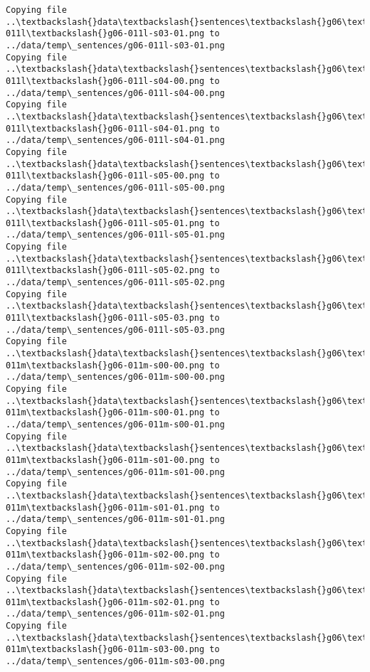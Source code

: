 \documentclass[11pt]{article}
\begin{document}
\begin{Verbatim}[commandchars=\\\{\}]
Copying file ..\textbackslash{}data\textbackslash{}sentences\textbackslash{}g06\textbackslash{}g06-011l\textbackslash{}g06-011l-s03-01.png to
../data/temp\_sentences/g06-011l-s03-01.png
Copying file ..\textbackslash{}data\textbackslash{}sentences\textbackslash{}g06\textbackslash{}g06-011l\textbackslash{}g06-011l-s04-00.png to
../data/temp\_sentences/g06-011l-s04-00.png
Copying file ..\textbackslash{}data\textbackslash{}sentences\textbackslash{}g06\textbackslash{}g06-011l\textbackslash{}g06-011l-s04-01.png to
../data/temp\_sentences/g06-011l-s04-01.png
Copying file ..\textbackslash{}data\textbackslash{}sentences\textbackslash{}g06\textbackslash{}g06-011l\textbackslash{}g06-011l-s05-00.png to
../data/temp\_sentences/g06-011l-s05-00.png
Copying file ..\textbackslash{}data\textbackslash{}sentences\textbackslash{}g06\textbackslash{}g06-011l\textbackslash{}g06-011l-s05-01.png to
../data/temp\_sentences/g06-011l-s05-01.png
Copying file ..\textbackslash{}data\textbackslash{}sentences\textbackslash{}g06\textbackslash{}g06-011l\textbackslash{}g06-011l-s05-02.png to
../data/temp\_sentences/g06-011l-s05-02.png
Copying file ..\textbackslash{}data\textbackslash{}sentences\textbackslash{}g06\textbackslash{}g06-011l\textbackslash{}g06-011l-s05-03.png to
../data/temp\_sentences/g06-011l-s05-03.png
Copying file ..\textbackslash{}data\textbackslash{}sentences\textbackslash{}g06\textbackslash{}g06-011m\textbackslash{}g06-011m-s00-00.png to
../data/temp\_sentences/g06-011m-s00-00.png
Copying file ..\textbackslash{}data\textbackslash{}sentences\textbackslash{}g06\textbackslash{}g06-011m\textbackslash{}g06-011m-s00-01.png to
../data/temp\_sentences/g06-011m-s00-01.png
Copying file ..\textbackslash{}data\textbackslash{}sentences\textbackslash{}g06\textbackslash{}g06-011m\textbackslash{}g06-011m-s01-00.png to
../data/temp\_sentences/g06-011m-s01-00.png
Copying file ..\textbackslash{}data\textbackslash{}sentences\textbackslash{}g06\textbackslash{}g06-011m\textbackslash{}g06-011m-s01-01.png to
../data/temp\_sentences/g06-011m-s01-01.png
Copying file ..\textbackslash{}data\textbackslash{}sentences\textbackslash{}g06\textbackslash{}g06-011m\textbackslash{}g06-011m-s02-00.png to
../data/temp\_sentences/g06-011m-s02-00.png
Copying file ..\textbackslash{}data\textbackslash{}sentences\textbackslash{}g06\textbackslash{}g06-011m\textbackslash{}g06-011m-s02-01.png to
../data/temp\_sentences/g06-011m-s02-01.png
Copying file ..\textbackslash{}data\textbackslash{}sentences\textbackslash{}g06\textbackslash{}g06-011m\textbackslash{}g06-011m-s03-00.png to
../data/temp\_sentences/g06-011m-s03-00.png

\end{Verbatim}
\end{document}
